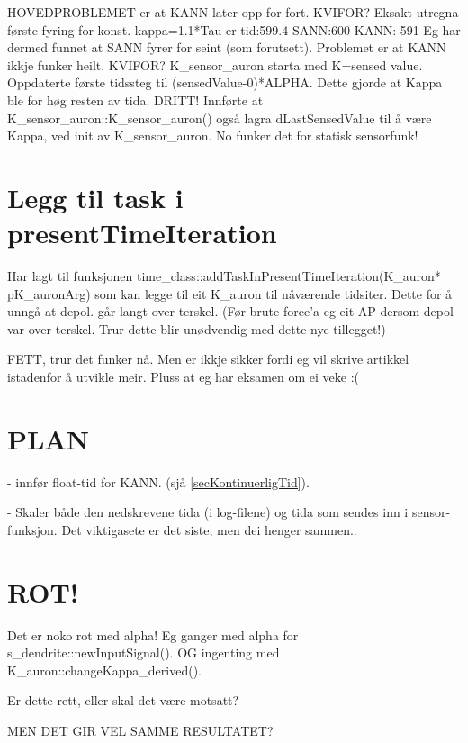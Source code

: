 	HOVEDPROBLEMET er at KANN later opp for fort. KVIFOR? Eksakt utregna første fyring for konst. kappa=1.1*Tau er tid:599.4  
	SANN:600 	KANN: 591
	Eg har dermed funnet at SANN fyrer for seint (som forutsett). Problemet er at KANN ikkje funker heilt. KVIFOR?
	K_sensor_auron starta med K=sensed value. Oppdaterte første tidssteg til (sensedValue-0)*ALPHA. Dette gjorde at Kappa ble for høg resten av tida. DRITT!
	Innførte at K_sensor_auron::K_sensor_auron() også lagra dLastSensedValue til å være Kappa, ved init av K_sensor_auron. No funker det for statisk sensorfunk!

\section{Legg til task i presentTimeIteration}
Har lagt til funksjonen time\_class::addTaskInPresentTimeIteration(K_auron* pK_auronArg) som kan legge til eit K\_auron til nåværende tidsiter.
Dette for å unngå at depol. går langt over terskel.
(Før brute-force'a eg eit AP dersom depol var over terskel. Trur dette blir unødvendig med dette nye tillegget!)

FETT, trur det funker nå. Men er ikkje sikker fordi eg vil skrive artikkel istadenfor å utvikle meir.
Pluss at eg har eksamen om ei veke :(



\section{PLAN}
	- innfør float-tid for KANN. (sjå \ref{secKontinuerligTid}).

	- Skaler både den nedskrevene tida (i log-filene) og tida som sendes inn i sensor-funksjon. Det viktigasete er det siste, men dei henger sammen..

\section{ROT!}
Det er noko rot med alpha! Eg ganger med alpha for s\_dendrite::newInputSignal(). OG ingenting med K\_auron::changeKappa\_derived().

Er dette rett, eller skal det være motsatt?

MEN DET GIR VEL SAMME RESULTATET?
